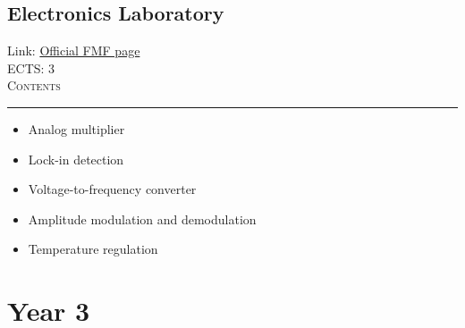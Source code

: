 \documentclass[11pt, a4paper]{article}
\newenvironment{course}[3]{
\subsection{#1}%
Link: \href{#2}{Official FMF page}\\%
ECTS: #3%
\vspace{1ex}
\\
{\large \textsc{Contents}}\\[-0.9ex]%
\rule{\textwidth}{0.5pt}
\vspace{-3ex}
}
{}
\newenvironment{chapter}[1]{
\begin{tcolorbox}[title=#1, breakable]
}
{\end{tcolorbox}}
\begin{document}
\begin{course}{Electronics Laboratory}{https://www.fmf.uni-lj.si/en/study-physics/programmes/1fiz/2020/7000777/courses/1136/}{3}
\begin{chapter}{List of labs and projects}
\begin{itemize}
            \item Analog multiplier

            \item Lock-in detection

            \item Voltage-to-frequency converter

            \item Amplitude modulation and demodulation

            \item Temperature regulation
        
        \end{itemize}
        
    \end{chapter}

\end{course}

\newpage
\section{Year 3}
\end{document}
